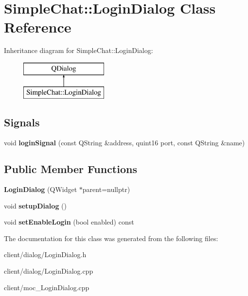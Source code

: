 \hypertarget{classSimpleChat_1_1LoginDialog}{\section{Simple\-Chat\-:\-:Login\-Dialog Class Reference}
\label{classSimpleChat_1_1LoginDialog}
}
Inheritance diagram for Simple\-Chat\-:\-:Login\-Dialog\-:\begin{figure}[H]
\begin{center}
\leavevmode
\includegraphics[height=2.000000cm]{classSimpleChat_1_1LoginDialog}
\end{center}
\end{figure}
\subsection*{Signals}
\begin{DoxyCompactItemize}
\item 
\hypertarget{classSimpleChat_1_1LoginDialog_a8fc7aa0dc471e1cde705bb74daadd3b5}{void {\bfseries login\-Signal} (const Q\-String \&address, quint16 port, const Q\-String \&name)}\label{classSimpleChat_1_1LoginDialog_a8fc7aa0dc471e1cde705bb74daadd3b5}

\end{DoxyCompactItemize}
\subsection*{Public Member Functions}
\begin{DoxyCompactItemize}
\item 
\hypertarget{classSimpleChat_1_1LoginDialog_a513ec2c3e7b82b47d71dc10ac1b73179}{{\bfseries Login\-Dialog} (Q\-Widget $\ast$parent=nullptr)}\label{classSimpleChat_1_1LoginDialog_a513ec2c3e7b82b47d71dc10ac1b73179}

\item 
\hypertarget{classSimpleChat_1_1LoginDialog_a254731e112e817fa66c323ef227a7ba3}{void {\bfseries setup\-Dialog} ()}\label{classSimpleChat_1_1LoginDialog_a254731e112e817fa66c323ef227a7ba3}

\item 
\hypertarget{classSimpleChat_1_1LoginDialog_ae53fd7b92225a512632d8836e35baad3}{void {\bfseries set\-Enable\-Login} (bool enabled) const }\label{classSimpleChat_1_1LoginDialog_ae53fd7b92225a512632d8836e35baad3}

\end{DoxyCompactItemize}


The documentation for this class was generated from the following files\-:\begin{DoxyCompactItemize}
\item 
client/dialog/Login\-Dialog.\-h\item 
client/dialog/Login\-Dialog.\-cpp\item 
client/moc\-\_\-\-Login\-Dialog.\-cpp\end{DoxyCompactItemize}
